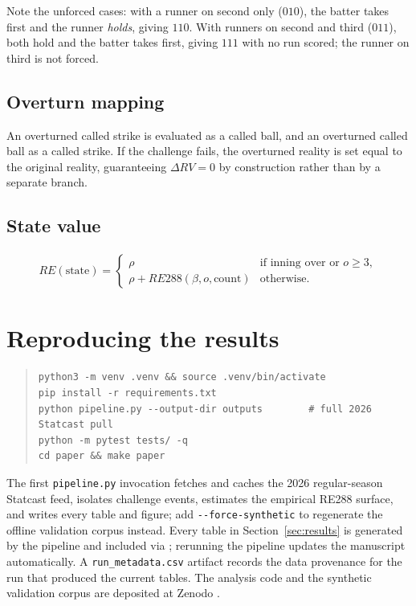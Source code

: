 Note the unforced cases: with a runner on second only ($010$), the batter takes
first and the runner \emph{holds}, giving $110$. With runners on second and
third ($011$), both hold and the batter takes first, giving $111$ with no run
scored; the runner on third is not forced.

\subsection{Overturn mapping}
An overturned called strike is evaluated as a called ball, and an overturned
called ball as a called strike. If the challenge fails, the overturned reality
is set equal to the original reality, guaranteeing $\Delta RV = 0$ by
construction rather than by a separate branch.

\subsection{State value}
\begin{align}
RE(\text{state}) =
\begin{cases}
\rho & \text{if inning over or } o \geq 3,\\
\rho + RE288(\beta, o, \text{count}) & \text{otherwise}.
\end{cases}
\end{align}

\section{Reproducing the results}
\label{app:repro}
\begin{quote}
\begin{verbatim}
python3 -m venv .venv && source .venv/bin/activate
pip install -r requirements.txt
python pipeline.py --output-dir outputs        # full 2026 Statcast pull
python -m pytest tests/ -q
cd paper && make paper
\end{verbatim}
\end{quote}
The first \texttt{pipeline.py} invocation fetches and caches the 2026
regular-season Statcast feed, isolates challenge events, estimates the empirical
RE288 surface, and writes every table and figure; add
\texttt{-{}-force-synthetic} to regenerate the offline validation corpus instead.
Every table in Section~\ref{sec:results} is generated by the pipeline and
included via \verb||; rerunning the pipeline updates the manuscript
automatically. A \texttt{run\_metadata.csv} artifact records the data
provenance for the run that produced the current tables. The analysis code and
the synthetic validation corpus are deposited at Zenodo
\citep{goldstein2026crv}.

